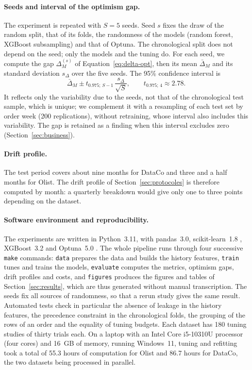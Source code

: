 \documentclass[11pt,a4paper]{article}
\theoremstyle{definition}
\begin{document}
\paragraph{Seeds and interval of the optimism gap.} The experiment is repeated with $S = 5$ seeds. Seed $s$ fixes the draw of the random split, that of its folds, the randomness of the models (random forest, XGBoost subsampling) and that of Optuna. The chronological split does not depend on the seed; only the models and the tuning do. For each seed, we compute the gap $\Delta_M^{(s)}$ of Equation~\eqref{eq:delta-opt}, then its mean $\bar\Delta_M$ and its standard deviation $s_\Delta$ over the five seeds. The 95\% confidence interval is
\begin{equation}
  \bar\Delta_M \pm t_{0.975;\,S-1}\,\frac{s_\Delta}{\sqrt{S}}, \qquad t_{0.975;\,4} \approx 2.78.
  \label{eq:ic-delta}
\end{equation}
It reflects only the variability due to the seeds, not that of the chronological test sample, which is unique; we complement it with a resampling of each test set by order week (200 replications), without retraining, whose interval also includes this variability. The gap is retained as a finding when this interval excludes zero (Section~\ref{sec:business}).

\paragraph{Drift profile.} The test period covers about nine months for DataCo and three and a half months for Olist. The drift profile of Section~\ref{sec:protocoles} is therefore computed by month: a quarterly breakdown would give only one to three points depending on the dataset.

\paragraph{Software environment and reproducibility.} The experiments are written in Python~3.11, with pandas~3.0, scikit-learn~1.8 \cite{pedregosa2011scikit}, XGBoost~3.2 \cite{chen2016xgboost} and Optuna~5.0 \cite{akiba2019optuna}. The whole pipeline runs through four successive \texttt{make} commands: \texttt{data} prepares the data and builds the history features, \texttt{train} tunes and trains the models, \texttt{evaluate} computes the metrics, optimism gaps, drift profiles and costs, and \texttt{figures} produces the figures and tables of Section~\ref{sec:results}, which are thus generated without manual transcription. The seeds fix all sources of randomness, so that a rerun study gives the same result. Automated tests check in particular the absence of leakage in the history features, the precedence constraint in the chronological folds, the grouping of the rows of an order and the equality of tuning budgets. Each dataset has 180 tuning studies of thirty trials each. On a laptop with an Intel Core i5-10310U processor (four cores) and 16~GB of memory, running Windows~11, tuning and refitting took a total of 55.3 hours of computation for Olist and 86.7 hours for DataCo, the two datasets being processed in parallel.
\end{document}
